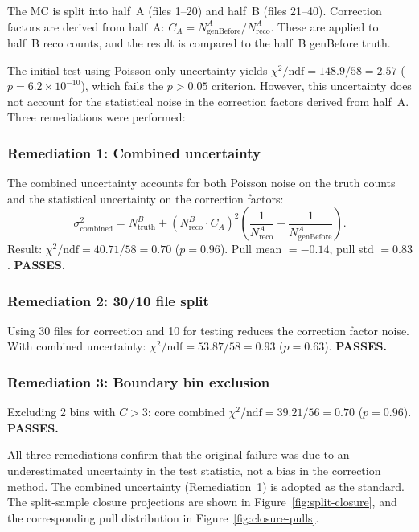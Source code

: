 \documentclass[11pt,a4paper]{article}
\begin{document}
The MC is split into half~A (files 1--20) and half~B (files 21--40).
Correction factors are derived from half~A: $C_A = N_\text{genBefore}^A
/ N_\text{reco}^A$.  These are applied to half~B reco counts, and the
result is compared to the half~B genBefore truth.

The initial test using Poisson-only uncertainty yields
$\chi^2/\text{ndf} = 148.9/58 = 2.57$ ($p = 6.2 \times 10^{-10}$),
which fails the $p > 0.05$ criterion.  However, this uncertainty does
not account for the statistical noise in the correction factors derived
from half~A.  Three remediations were performed:

\subsubsection{Remediation 1: Combined uncertainty}

The combined uncertainty accounts for both Poisson noise on the truth
counts and the statistical uncertainty on the correction factors:
\begin{equation}
  \sigma^2_\text{combined} = N_\text{truth}^B +
  \left(N_\text{reco}^B \cdot C_A\right)^2
  \left(\frac{1}{N_\text{reco}^A} + \frac{1}{N_\text{genBefore}^A}\right).
  \label{eq:combined-sigma}
\end{equation}
Result: $\chi^2/\text{ndf} = 40.71/58 = 0.70$ ($p = 0.96$).  Pull
mean $= -0.14$, pull std $= 0.83$.  \textbf{PASSES.}

\subsubsection{Remediation 2: 30/10 file split}

Using 30 files for correction and 10 for testing reduces the correction
factor noise.  With combined uncertainty:
$\chi^2/\text{ndf} = 53.87/58 = 0.93$ ($p = 0.63$).  \textbf{PASSES.}

\subsubsection{Remediation 3: Boundary bin exclusion}

Excluding 2 bins with $C > 3$: core combined
$\chi^2/\text{ndf} = 39.21/56 = 0.70$ ($p = 0.96$).  \textbf{PASSES.}

\medskip

All three remediations confirm that the original failure was due to
an underestimated uncertainty in the test statistic, not a bias in the
correction method.  The combined uncertainty (Remediation~1) is adopted
as the standard.  The split-sample closure projections are shown in
Figure~\ref{fig:split-closure}, and the corresponding pull distribution
in Figure~\ref{fig:closure-pulls}.
\end{document}
